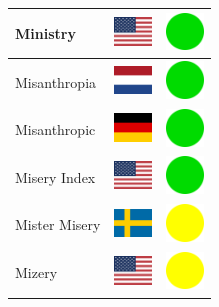 \documentclass[12pt, a4paper, twoside]{report}
\begin{document}
\begin{center}
\begin{longtable}{|p{5cm}|p{2cm}|p{2cm}|}
 Ministry                                                   & \includegraphics[width=1cm]{4x3/us} &   \includegraphics[width=1cm]{likes/y} \\ \hline
 Misanthropia                                               & \includegraphics[width=1cm]{4x3/nl} &   \includegraphics[width=1cm]{likes/y} \\ \hline
 Misanthropic                                               & \includegraphics[width=1cm]{4x3/de} &   \includegraphics[width=1cm]{likes/y} \\ \hline
 Misery Index                                               & \includegraphics[width=1cm]{4x3/us} &   \includegraphics[width=1cm]{likes/y} \\ \hline
 Mister Misery                                              & \includegraphics[width=1cm]{4x3/se} &   \includegraphics[width=1cm]{likes/m} \\ \hline
 Mizery                                                     & \includegraphics[width=1cm]{4x3/us} &   \includegraphics[width=1cm]{likes/m} \\ \hline

\end{longtable}
\end{center}
\end{document}
